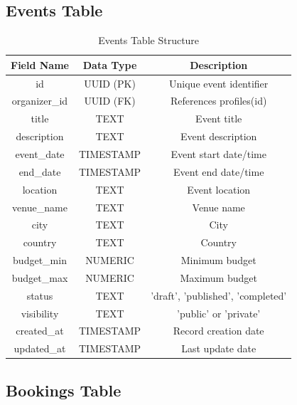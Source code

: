 \documentclass[12pt,a4paper]{report}
\begin{document}
\subsection*{Events Table}

\begin{table}[H]
\centering
\caption{Events Table Structure}
\begin{tabular}{|c|c|c|}
\hline
\textbf{Field Name} & \textbf{Data Type} & \textbf{Description} \\
\hline
id & UUID (PK) & Unique event identifier \\
organizer\_id & UUID (FK) & References profiles(id) \\
title & TEXT & Event title \\
description & TEXT & Event description \\
event\_date & TIMESTAMP & Event start date/time \\
end\_date & TIMESTAMP & Event end date/time \\
location & TEXT & Event location \\
venue\_name & TEXT & Venue name \\
city & TEXT & City \\
country & TEXT & Country \\
budget\_min & NUMERIC & Minimum budget \\
budget\_max & NUMERIC & Maximum budget \\
status & TEXT & 'draft', 'published', 'completed' \\
visibility & TEXT & 'public' or 'private' \\
created\_at & TIMESTAMP & Record creation date \\
updated\_at & TIMESTAMP & Last update date \\
\hline
\end{tabular}
\end{table}

\subsection*{Bookings Table}
\end{document}
